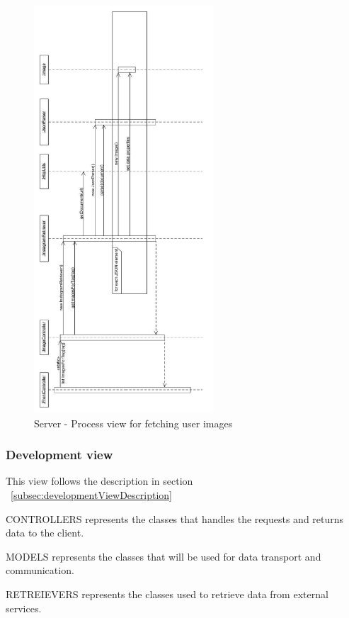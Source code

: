 \documentclass[11pt]{book}
\begin{document}
\begin{figure}[H]
      \centering
      \includegraphics[width=0.6\textwidth]{Figures/Architecture/Sequence/image.jpg}
      \caption{Server - Process view for fetching user images}
      \label{fig:arch_server_process_image}
\end{figure}

\subsubsection{Development view}
This view follows the description in section ~\ref{subsec:developmentViewDescription}

CONTROLLERS represents the classes that handles the requests and returns data to the client.

MODELS represents the classes that will be used for data transport and communication.

RETREIEVERS represents the classes used to retrieve data from external services.
\end{document}
